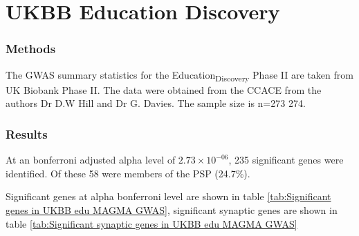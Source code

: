 \section{UKBB Education Discovery}

\subsubsection{Methods}
The GWAS summary statistics for the Education\textsubscript{Discovery} Phase II are taken from UK Biobank Phase II. The data were obtained from the CCACE  from the authors Dr D.W Hill and Dr G. Davies. The sample size is n=273 274.

\subsubsection{Results}
At an bonferroni adjusted alpha level of $2.73 \times 10^{-06}$, 235 significant genes were identified. Of these 58 were members of the PSP (24.7\%).  

Significant genes at alpha bonferroni level are shown in table \ref{tab:Significant genes in UKBB edu MAGMA GWAS}, significant synaptic genes are shown in table \ref{tab:Significant synaptic genes in UKBB edu  MAGMA GWAS}


